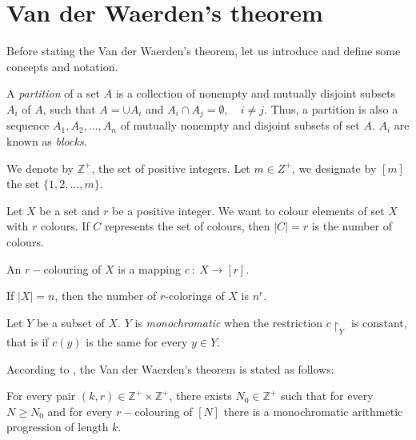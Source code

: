 \section{Van der Waerden's theorem}

Before stating the Van der Waerden's theorem, let us introduce and define some concepts and notation.

A \textit{partition} of a set $A$ is a collection of nonempty and mutually disjoint subsets $A_i$ of $A$, such that  $A=\cup A_i$ and $A_i \cap A_j=\emptyset, \quad i\neq j.$ Thus, a partition is also a sequence $A_1, A_2, \ldots, A_n$ of mutually nonempty and  disjoint subsets of set $A$. $A_i$ are known as \textit{blocks}.

We denote by $\mathbb{Z}^+$, the set of positive integers.
Let $m \in \mathit{Z}^+$, we designate by $[m]$ the set $\{1,2, \ldots, m\}.$

Let $X$ be a set and $r$ be a positive integer. We want to colour elements of set $X$ with $r$ colours. If $C$ represents the set of colours, then $|C|=r$ is the number of colours.

\begin{defn} An $r-$colouring of $X$ is a mapping $c \ : \ X \longrightarrow [r].$  \label{rcol}\end{defn}


If $|X|=n$, then the number of $r$-colorings of $X$ is $n^r.$


Let $Y$ be a subset of $X.$ $Y$ is \textit{monochromatic} when the restriction $c\restriction_Y$ is constant, that is   if $c(y)$ is the same for every $y \in Y.$


According to \cite{polymath2012new}, the Van der Waerden's theorem is stated as follows:

\begin{thm}
For every pair $(k,r) \in \mathbb{Z}^+ \times \mathbb{Z}^+$, there exists $N_0 \in \mathbb{Z}^+$ such that for every $N \geq N_0$ and for 
every $r-$colouring of $[N]$ there is a monochromatic arithmetic progression of length $k.$  \label{vd1}
\end{thm}

